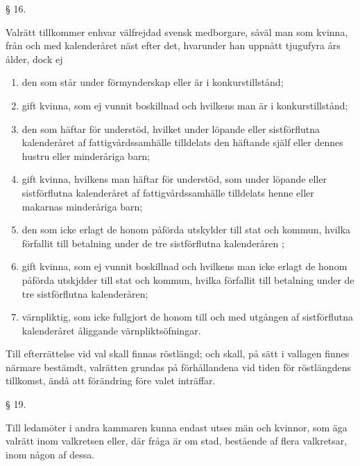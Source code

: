 \documentclass[a4paper]{article}
\renewcommand{\section}[1]{\begin{center}§ #1.\end{center}}
\begin{document}
\section{16}
Valrätt tillkommer enhvar välfrejdad svensk medborgare, såväl man som kvinna,
från och med kalenderåret näst efter det, hvarunder han uppnått tjugufyra års
ålder, dock ej
\begin{enumerate}[label=\alph*)]
        \item den som står under förmynderskap eller är i konkurstillstånd;
        \item gift kvinna, som ej vunnit boskillnad och hvilkens man är i
                konkurstillstånd;
        \item den som häftar för understöd, hvilket under löpande eller
                sistförflutna kalenderåret af fattigvårdssamhälle tilldelats
                den häftande själf eller dennes hustru eller minderåriga barn;
        \item gift kvinna, hvilkens man häftar för understöd, som under löpande
                eller sistförflutna kalenderåret af fattigvårdssamhälle
                tilldelats henne eller makarnas minderåriga barn;
        \item den som icke erlagt de honom påförda utskylder till stat och
                kommun, hvilka förfallit till betalning under de tre
                sistförflutna kalenderåren ;
        \item gift kvinna, som ej vunnit boskillnad och hvilkens man icke
                erlagt de honom påförda utskjdder till stat och kommun, hvilka
                förfallit till betalning under de tre sistförflutna
                kalenderåren;
        \item värnpliktig, som icke fullgjort de honom till och med utgången af
                sistförflutna kalenderåret åliggande värnpliktsöfningar.
\end{enumerate}

Till efterrättelse vid val skall finnas röstlängd; och skall, på sätt i
vallagen finnes närmare bestämdt, valrätten grundas på förhållandena vid tiden
för röstlängdens tillkomst, ändå att förändring före valet inträffar.

\section{19}
Till ledamöter i andra kammaren kunna endast utses män och kvinnor, som äga
valrätt inom valkretsen eller, där fråga är om stad, bestående af flera
valkretsar, inom någon af dessa.
\end{document}

